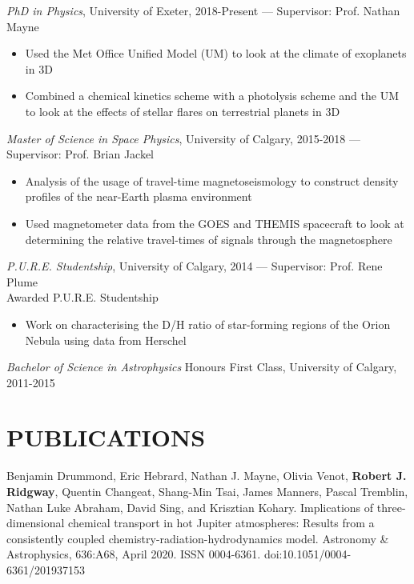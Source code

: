 \documentclass[letter, margin, 10pt]{res} %
\begin{document}
\begin{resume}
{\sl PhD in Physics}, University of Exeter, 2018-Present --- Supervisor: Prof. Nathan Mayne\\
\begin{itemize}[noitemsep,topsep=0pt,parsep=0pt,partopsep=0pt]
\item Used the Met Office Unified Model (UM) to look at the climate of exoplanets in 3D
\item Combined a chemical kinetics scheme with a photolysis scheme and the UM to look at the effects of stellar flares on terrestrial planets in 3D
\end{itemize}
\vspace{-10pt}
{\sl Master of Science in Space Physics}, University of Calgary, 2015-2018 --- Supervisor: Prof. Brian Jackel
\begin{itemize}[noitemsep,topsep=0pt,parsep=0pt,partopsep=0pt]
\item Analysis of the usage of travel-time magnetoseismology to construct density profiles of the near-Earth plasma environment
\item Used magnetometer data from the GOES and THEMIS spacecraft to look at determining the relative travel-times of signals  through the magnetosphere
\end{itemize}
\vspace{-10pt}
{\sl P.U.R.E. Studentship}, University of Calgary, 2014 --- Supervisor: Prof. Rene Plume\\
\null\quad\quad Awarded P.U.R.E. Studentship
\begin{itemize}[noitemsep,topsep=0pt,parsep=0pt,partopsep=0pt]
\item Work on characterising the D/H ratio of star-forming regions of the Orion Nebula using data from Herschel
\end{itemize}
\vspace{-10pt}
{\sl Bachelor of Science in Astrophysics} Honours First Class, University of Calgary, 2011-2015




\section{PUBLICATIONS}

Benjamin Drummond, Eric Hebrard, Nathan J. Mayne, Olivia Venot, \textbf{Robert J. Ridgway}, Quentin Changeat, Shang-Min Tsai, James Manners, Pascal Tremblin, Nathan Luke Abraham, David Sing, and Krisztian Kohary. Implications of three-dimensional chemical transport in hot Jupiter atmospheres: Results from a consistently coupled chemistry-radiation-hydrodynamics model. Astronomy \& Astrophysics, 636:A68, April 2020. ISSN 0004-6361. doi:10.1051/0004-6361/201937153


\end{resume}
\end{document}
